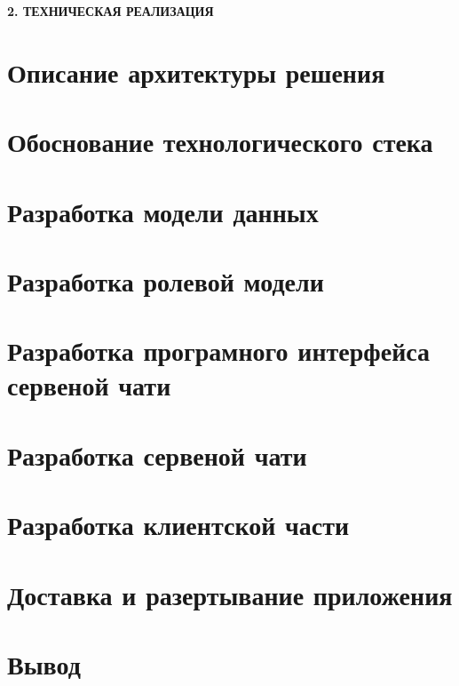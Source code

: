\newpage
\begin{center}
  \textbf{\large 2. ТЕХНИЧЕСКАЯ РЕАЛИЗАЦИЯ}
\end{center}

\section{Описание архитектуры решения}

\section{Обоснование технологического стека}

\section{Разработка модели данных}

\section{Разработка ролевой модели}

\section{Разработка програмного интерфейса сервеной чати}

\section{Разработка сервеной чати}

\section{Разработка клиентской части}

\section{Доставка и разертывание приложения}

\section{Вывод}
